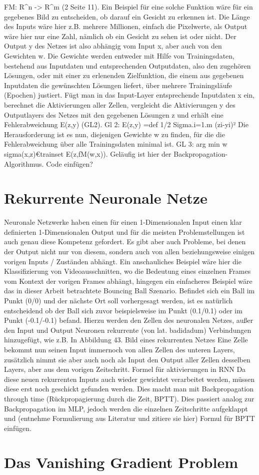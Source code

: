 FM: R^n -> R^m (2 Seite 11). 
Ein Beispiel für eine solche Funktion wäre für ein gegebenes Bild zu entscheiden, ob darauf ein Gesicht zu erkennen ist. Die Länge des Inputs wäre hier z.B. mehrere Millionen, einfach die Pixelwerte, als Output wäre hier nur eine Zahl, nämlich ob ein Gesicht zu sehen ist oder nicht. Der Output y des Netzes ist also abhängig vom Input x, aber auch von den Gewichten w.
Die Gewichte werden entweder mit Hilfe von Trainingsdaten, bestehend aus Inputdaten und entsprechenden Outputdaten, also den zugehören Lösungen, oder mit einer zu erlenenden Zielfunktion, die einem aus gegebenen Inputdaten die gewünschten Lösungen liefert, über mehrere Trainingsläufe (Epochen) justiert. Fügt man in das Input-Layer entsprechende Inputdaten x ein, berechnet die Aktivierungen aller Zellen, vergleicht die Aktivierungen y des Outputlayers des Netzes mit den gegebenen Lösungen z und erhält eine Fehlerabweichung E(z,y) (GL2). 
Gl 2: E(z,y) =def 1/2 Sigma.i=1.m (zi-yi)²
Die Herausforderung ist es nun, diejenigen Gewichte w zu finden, für die die Fehlerabweichung über alle Trainingsdaten minimal ist.
GL 3: arg min w sigma(x,z)€trainset E(z,fM(w,x)).
Geläufig ist hier der Backpropagation-Algorithmus. 
Code einfügen? 
\section{Rekurrente Neuronale Netze}

Neuronale Netzwerke haben einen für einen 1-Dimensionalen Input einen klar definierten 1-Dimensionalen Output und für die meisten Problemstellungen ist auch genau diese Kompetenz gefordert. Es gibt aber auch Probleme, bei denen der Output nicht nur von diesem, sondern auch von allen beziehungsweise einigen vorigen Inputs / Zuständen abhängt. Ein anschauliches Beispiel wäre hier die Klassifizierung von Videoausschnitten, wo die Bedeutung eines einzelnen Frames vom Kontext der vorigen Frames abhängt, hingegen ein einfacheres Beispiel wäre das in dieser Arbeit betrachtete Bouncing Ball Szenario. Befindet sich ein Ball im Punkt (0/0) und der nächste Ort soll vorhergesagt werden, ist es natürlich entscheidend ob der Ball sich zuvor beispielsweise im Punkt (0.1/0.1) oder im Punkt (-0.1/-0.1) befand. Hierzu werden den Zellen des neuronalen Netzes, außer den Input und Output Neuronen rekurrente (von lat. badidadum) Verbindungen hinzugefügt, wie z.B. In Abbildung 43.
Bild eines rekurrenten Netzes
Eine Zelle bekommt nun seinen Input immernoch von allen Zellen des unteren Layers, zusätzlich nimmt sie aber auch noch als Input den Output aller Zellen desselben Layers, aber aus dem vorigen Zeitschritt. 
Formel für aktivierungen in RNN
Da diese neuen rekurrenten Inputs auch wieder gewichtet verarbeitet werden, müssen diese erst noch geschickt gefunden werden. Dies macht man mit Backpropagation through time (Rückpropagierung durch die Zeit, BPTT). Dies passiert analog zur Backpropagation im MLP, jedoch werden die einzelnen Zeitschritte aufgeklappt und (entnehme Formulierung aus Literatur und zitiere sie hier) 
Formul für BPTT einfügen.

\section{Das Vanishing Gradient Problem}